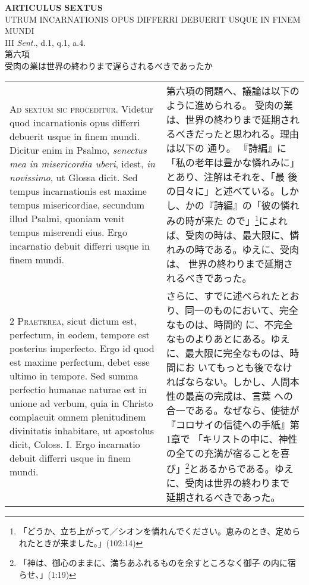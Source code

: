 \documentclass[10pt]{jsarticle} %
\begin{document}
\begin{center}
 {\Large {\bf ARTICULUS SEXTUS}}\\
 {\large UTRUM INCARNATIONIS OPUS DIFFERRI DEBUERIT USQUE IN FINEM MUNDI}\\
 {\footnotesize III {\itshape Sent.}, d.1, q.1, a.4.}\\
 {\Large 第六項\\受肉の業は世界の終わりまで遅らされるべきであったか}
\end{center}

\begin{longtable}{p{21em}p{21em}}

{\Huge A}{\scshape d sextum sic proceditur}. Videtur quod
incarnationis opus differri debuerit usque in finem mundi. Dicitur enim
in Psalmo, {\itshape senectus mea in misericordia uberi}, idest, {\itshape in novissimo}, ut
Glossa dicit. Sed tempus incarnationis est maxime tempus misericordiae,
secundum illud Psalmi, quoniam venit tempus miserendi eius. Ergo
incarnatio debuit differri usque in finem mundi.


&

第六項の問題へ、議論は以下のように進められる。
受肉の業は、世界の終わりまで延期されるべきだったと思われる。理由は以下の
 通り。
『詩編』に「私の老年は豊かな憐れみに」とあり、注解はそれを、「最
 後の日々に」と述べている。しかし、かの『詩編』の「彼の憐れみの時が来た
 ので」\footnote{「どうか、立ち上がって／シオンを憐れんでください。恵みのとき、定められたときが来ました。」(102:14)}によれば、受肉の時は、最大限に、憐れみの時である。ゆえに、受肉は、
 世界の終わりまで延期されるべきであった。


\\


{\scshape 2 Praeterea}, sicut dictum est, perfectum, in
eodem, tempore est posterius imperfecto. Ergo id quod est maxime
perfectum, debet esse ultimo in tempore. Sed summa perfectio humanae
naturae est in unione ad verbum, quia in Christo complacuit omnem
plenitudinem divinitatis inhabitare, ut apostolus dicit, Coloss. I. Ergo
incarnatio debuit differri usque in finem mundi.


&

さらに、すでに述べられたとおり、同一のものにおいて、完全なものは、時間的
 に、不完全なものよりあとにある。ゆえに、最大限に完全なものは、時間にお
 いてもっとも後でなければならない。しかし、人間本性の最高の完成は、言葉
 への合一である。なぜなら、使徒が『コロサイの信徒への手紙』第1章で
 「キリストの中に、神性の全ての充満が宿ることを喜び」\footnote{「神は、御心のままに、満ちあふれるものを余すところなく御子
 の内に宿らせ、」(1:19)}とあるからである。ゆえに、受肉は世界の終わりまで
 延期されるべきであった。



\end{longtable}
\end{document}
